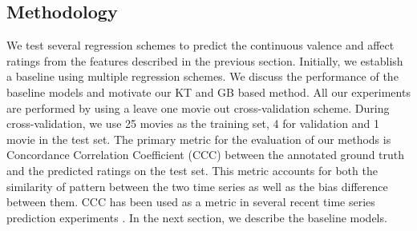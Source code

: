 \documentclass{article}
\begin{document}
\begin{spacing}{0.9}

\vspace{-2mm}
\section{Methodology}
\vspace{-2mm}

We test several regression schemes to predict the continuous valence and affect ratings from the features described in the previous section.
Initially, we establish a baseline using multiple regression schemes.
We discuss the performance of the baseline models and motivate our KT and GB based method.
All our experiments are performed by using a leave one movie out cross-validation scheme.
During cross-validation, we use 25 movies as the training set, 4 for validation and 1 movie in the test set.
The primary metric for the evaluation of our methods is Concordance Correlation Coefficient (CCC) \cite{liao2000note} between the annotated ground truth and the predicted ratings on the test set.
This metric accounts for both the similarity of pattern between the two time series as well as the bias difference between them. 
CCC has been used as a metric in several recent time series prediction experiments \cite{valstar2016avec}. 
In the next section, we describe the baseline models.

\vspace{-2mm}

\end{spacing}
\end{document}
